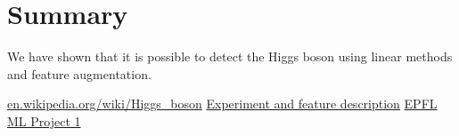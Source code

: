 \documentclass[10pt,conference,compsocconf]{IEEEtran}
\begin{document}
\section{Summary}
We have shown that it is possible to detect the Higgs boson using linear methods and feature augmentation.
\begin{thebibliography}{99}
 \href{https://en.wikipedia.org/wiki/Higgs\_boson}{en.wikipedia.org/wiki/Higgs\_boson}
 \href{http://higgsml.lal.in2p3.fr/files/2014/04/documentation\_v1.8.pdf}{Experiment and feature description}
 \href{http://kaggle.com/c/epfml-higgs}{EPFL ML Project 1}
\end{thebibliography}
\end{document}
